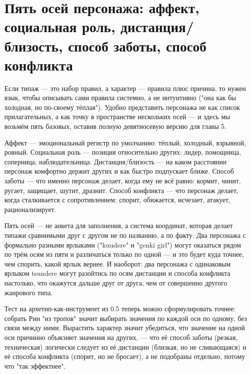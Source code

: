 \section{Пять осей персонажа: аффект, социальная роль, дистанция/близость, способ заботы, способ конфликта}

Если типаж — это набор правил, а характер — правила плюс причина, то нужен язык, чтобы описывать сами правила системно, а не интуитивно ("она как бы холодная, но по-своему тёплая"). Удобно представить персонажа не как список прилагательных, а как точку в пространстве нескольких осей — и здесь мы возьмём пять базовых, оставив полную девятиосевую версию для главы 5.

Аффект — эмоциональный регистр по умолчанию: тёплый, холодный, взрывной, ровный. Социальная роль — позиция относительно других: лидер, помощница, соперница, наблюдательница. Дистанция/близость — на каком расстоянии персонаж комфортно держит других и как быстро подпускает ближе. Способ заботы — что именно персонаж делает, когда ему не всё равно: кормит, чинит, ругает, защищает, шутит, дразнит. Способ конфликта — что персонаж делает, когда сталкивается с сопротивлением: спорит, обижается, исчезает, атакует, рационализирует.

Пять осей — не анкета для заполнения, а система координат, которая делает типажи сравнимыми друг с другом не по названию, а по факту. Два персонажа с формально разными ярлыками ("kuudere" и "genki girl") могут оказаться рядом по трём осям из пяти и различаться только по одной — и это будет куда точнее, чем спорить, какой ярлык вернее. И наоборот: два персонажа с одинаковым ярлыком tsundere могут разойтись по осям дистанции и способа конфликта настолько, что окажутся дальше друг от друга, чем от совершенно другого жанрового типа.

Тест на архетип-как-инструмент из 0.5 теперь можно сформулировать точнее: собрать Рин "из тропов" значит выбирать значения по каждой оси по одному, без связи между ними. Вырастить характер значит убедиться, что значение на одной оси причинно объясняет значения на других, — что её способ заботы (резкая, техническая) логически следует из её дистанции (близкая, но не сливающаяся) и её способа конфликта (спорит, но не бросает), а не подобраны отдельно, потому что "так эффектнее".
